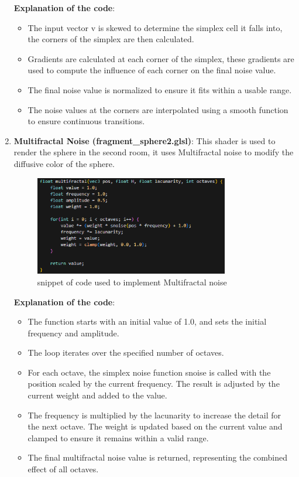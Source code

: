 \documentclass[12pt]{article}
\begin{document}
\begin{enumerate}
    \textbf{Explanation of the code}:
    \begin {itemize}
        \item The input vector v is skewed to determine the simplex cell it falls into, the corners of the simplex are then calculated.
        \item Gradients are calculated at each corner of the simplex, these gradients are used to compute the influence of each corner on the final noise value.
        \item The final noise value is normalized to ensure it fits within a usable range.
        \item The noise values at the corners are interpolated using a smooth function to ensure continuous transitions.    
    \end{itemize}

    \newpage

    \item \textbf{Multifractal Noise (fragment\_sphere2.glsl)}:
    \newline
    This shader is used to render the sphere in the second room, it uses Multifractal noise to modify the diffusive color of the sphere.

    \begin{figure}[H]
        \centering
        \includegraphics[width=0.8\textwidth]{Images/sphere2code.png}
        \caption{snippet of code used to implement Multifractal noise}
    \end{figure}

    \textbf{Explanation of the code}:
    \begin {itemize}
        \item The function starts with an initial value of 1.0, and sets the initial frequency and amplitude.
        \item The loop iterates over the specified number of octaves.
        \item For each octave, the simplex noise function snoise is called with the position scaled by the current frequency. 
            The result is adjusted by the current weight and added to the value.  
        \item The frequency is multiplied by the lacunarity to increase the detail for the next octave. 
            The weight is updated based on the current value and clamped to ensure it remains within a valid range.
        \item The final multifractal noise value is returned, representing the combined effect of all octaves.
    \end{itemize}


\end{enumerate}
\end{document}

